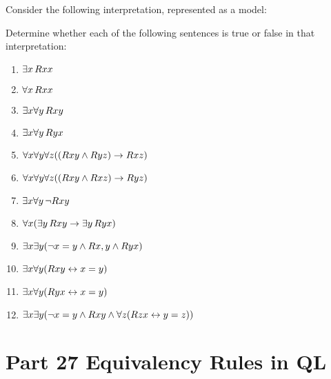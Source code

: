 \leibniz
\practiceproblems
\problempart
\label{pr.TorF3}
Consider the following interpretation, represented as a model:	
\begin{center}
\end{center}
Determine whether each of the following sentences is true or false in that interpretation:
\begin{enumerate}
\item $\exists x\, \mathord{R}xx$
\item $\forall x\, \mathord{R}xx$
\item $\exists x \forall y\, \mathord{R}xy$
\item $\exists x \forall y\, \mathord{R}yx$
\item $\forall x \forall y \forall z ((\mathord{R}xy \wedge \mathord{R}yz) \rightarrow \mathord{R}xz)$
\item $\forall x \forall y \forall z ((\mathord{R}xy \wedge \mathord{R}xz) \rightarrow \mathord{R}yz)$
\item $\exists x \forall y\, \neg \mathord{R}xy$
\item $\forall x(\exists y\, \mathord{R}xy \rightarrow \exists y\, \mathord{R}yx)$
\item $\exists x \exists y (\neg x = y \wedge \mathord{R}x,y \wedge \mathord{R}yx)$
\item $\exists x \forall y(\mathord{R}xy \leftrightarrow x = y)$
\item $\exists x \forall y(\mathord{R}yx \leftrightarrow x = y)$
\item $\exists x \exists y(\neg x = y \wedge \mathord{R}xy \wedge \forall z(\mathord{R}zx \leftrightarrow y = z))$
\end{enumerate}




\chapter{Part 27 Equivalency Rules in QL}
